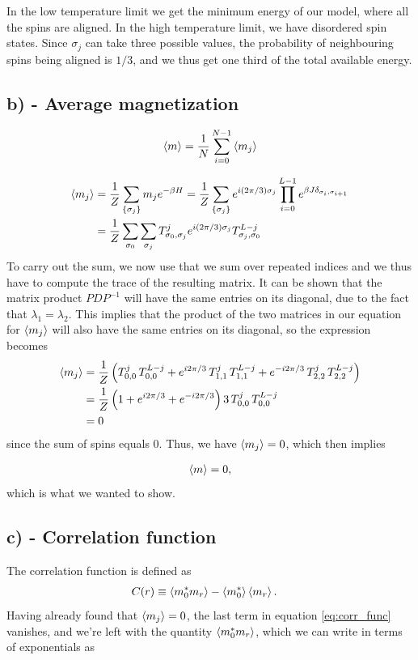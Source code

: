 \documentclass[reprint,english,notitlepage,aps,nobalancelastpage,nofootinbib]{revtex4-1}
\newcommand{\closed}[1]{\left(#1\right)}
\newcommand{\sumstate}{\sum_{\{\sigma_j\}}}
\newcommand{\prodstate}{\prod_{i=0}^{L-1}}
\renewcommand{\l}{\lambda}
\newcommand{\mj}{m_j}
\begin{document}
In the low temperature limit we get the minimum energy of our model, where all the spins are aligned. In the high temperature limit, we have disordered spin states. Since $\sigma_j$ can take three possible values, the probability of neighbouring spins being aligned is $1/3$, and we thus get one third of the total available energy.  


\subsection*{b) - Average magnetization}

\begin{align*}
	\expval{m} = \frac{1}{N} \sum_{i=0}^{N-1}\expval{m_j}
\end{align*}


\begin{align*}
	\expval{m_j} &= \frac{1}{Z} \sumstate \mj e^{-\beta H} = \frac{1}{Z} \sumstate e^{i(2\pi/3)\sigma_j} \prodstate e^{\beta J \delta_{\sigma_i,\sigma_{i+1}}} \\ 
	&= \frac{1}{Z} \sum_{\sigma_0} \sum_{\sigma_j} T_{\sigma_0,\sigma_j}^j e^{i(2\pi/3)\sigma_j} T_{\sigma_j,\sigma_0}^{L-j}
\end{align*}
To carry out the sum, we now use that we sum over repeated indices and we thus have to compute the trace of the resulting matrix. It can be shown that the matrix product $PDP^{-1}$ will have the same entries on its diagonal, due to the fact that $\l_1=\l_2$. This implies that the product of the two matrices in our equation for $\expval{\mj}$ will also have the same entries on its diagonal, so the expression becomes
\begin{align*}
	\expval{\mj} &= \frac{1}{Z} \closed{T_{0,0}^j\,T_{0,0}^{L-j} + e^{i2\pi/3} \,T_{1,1}^j\,T_{1,1}^{L-j} + e^{-i2\pi/3}\,T_{2,2}^j\,T_{2,2}^{L-j}} \\ 
	&= \frac{1}{Z} \closed{1 + e^{i2\pi/3} + e^{-i2\pi/3}} 3\,T_{0,0}^{j} \, T_{0,0}^{L-j} \\ 
	&= 0
\end{align*}  
since the sum of spins equals $0$. Thus, we have $\expval{\mj}=0$, which then implies

\begin{align*}
	\expval{m} = 0,
\end{align*}
which is what we wanted to show.

\subsection*{c) - Correlation function}
The correlation function is defined as 
\begin{align} \label{eq:corr_func}
	C(r) &\equiv \expval{m_0^* m_r} - \expval{m_0^*}\expval{m_r}.
\end{align}
Having already found that $\expval{\mj}=0$, the last term in equation \eqref{eq:corr_func} vanishes, and we're left with the quantity $\expval{m_0^* m_r}$, which we can write in terms of exponentials as 
\end{document}
